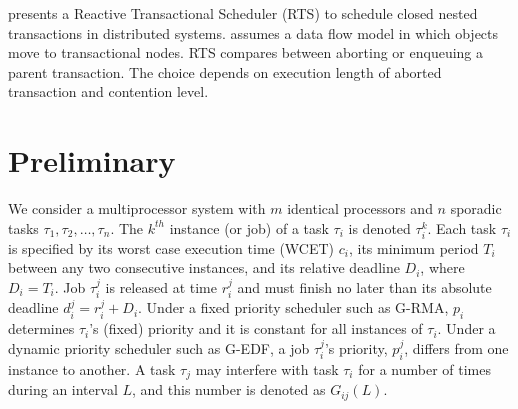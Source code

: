 \documentclass[letter]{sig-alternate}
\begin{document}
\cite{6267834} presents a Reactive Transactional Scheduler (RTS) to schedule closed nested transactions in distributed systems. \cite{6267834} assumes a data flow model in which objects move to transactional nodes. RTS compares between aborting or enqueuing a parent transaction. The choice depends on execution length of aborted transaction and contention level. 
%
\begin{comment}
Our work builds upon~\cite{stmconcurrencycontrol:emsoft11,lcmdac2012,pnf_dac_asp}. FBLT allows multiple objects per transaction with no a-priori knowledge needed about those objects. We upper bound transactional retries and task response times under FBLT, and identify the conditions under which FBLT has  better schedulability than other synchronization techniques.
\end{comment}
%
\section{Preliminary}

We consider a multiprocessor system with $m$ identical processors and $n$ sporadic tasks $\tau_1, \tau_2,\ldots, \tau_n$. The $k^{th}$ instance (or job) of a task $\tau_i$ is denoted $\tau_i^k$. Each task $\tau_i$ is specified by its worst case execution time (WCET) $c_i$, its minimum period $T_i$ between any two consecutive instances, and its relative deadline $D_i$, where $D_i=T_i$. Job $\tau_i^j$ is released at time $r_i^j$ and must finish no later than its absolute deadline $d_i^j=r_i^j+D_i$. Under a fixed priority scheduler such as G-RMA, $p_i$ determines $\tau_i$'s (fixed) priority and it is constant for all instances of $\tau_i$. Under a dynamic priority scheduler such as G-EDF, a job $\tau_i^j$'s priority, $p_i^j$, differs from one instance to another. 
A task $\tau_j$ may interfere with task $\tau_i$ for a number of times during an interval $L$, and this number is denoted as $G_{ij}(L)$. 
\end{document}
